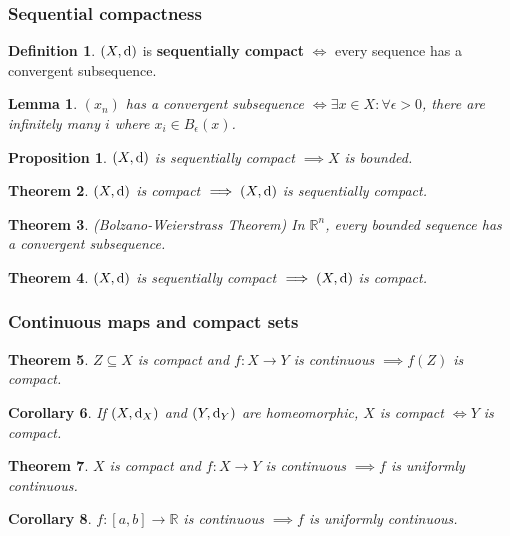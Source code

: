 \documentclass[12pt]{article}
\newtheorem{thm}{Theorem}[section]
\newtheorem{lem}[thm]{Lemma}
\newtheorem{cor}[thm]{Corollary}
\newtheorem*{prop*}{Proposition}
\theoremstyle{definition}
\newtheorem{defn}{Definition}[section]
\renewcommand{\d}{{\textnormal{d}}}
\begin{document}
\subsubsection{Sequential compactness}

\begin{defn}
	$(X, \d)$ is \textbf{sequentially compact} $\iff$ every sequence has a convergent subsequence.
\end{defn}

\begin{lem}
	$(x_n)$ has a convergent subsequence $\iff \exists x \in X : \forall \epsilon > 0$, there are infinitely many $i$ where $x_i \in B_{\epsilon}(x)$.
\end{lem}

\begin{prop*}
	$(X, \d)$ is sequentially compact $\implies X$ is bounded.
\end{prop*}

\begin{thm}
	$(X, \d)$ is compact $\implies (X, \d)$ is sequentially compact.
\end{thm}

\begin{thm}
	(Bolzano-Weierstrass Theorem)
	In $\mathbb{R}^n$, every bounded sequence has a convergent subsequence.
\end{thm}

\begin{thm}
	$(X, \d)$ is sequentially compact $\implies (X, \d)$ is compact.
\end{thm}

\subsubsection{Continuous maps and compact sets}

\begin{thm}
	$Z \subseteq X$ is compact and $f : X \to Y$ is continuous $\implies f(Z)$ is compact.
\end{thm}

\begin{cor}
	If $(X, \d_X)$ and $(Y, \d_Y)$ are homeomorphic, $X$ is compact $\iff Y$ is compact.
\end{cor}

\begin{thm}
	$X$ is compact and $f : X \to Y$ is continuous $\implies f$ is uniformly continuous.
\end{thm}

\begin{cor}
	$f : [a, b] \to \mathbb{R}$ is continuous $\implies f$ is uniformly continuous.
\end{cor}
\end{document}

